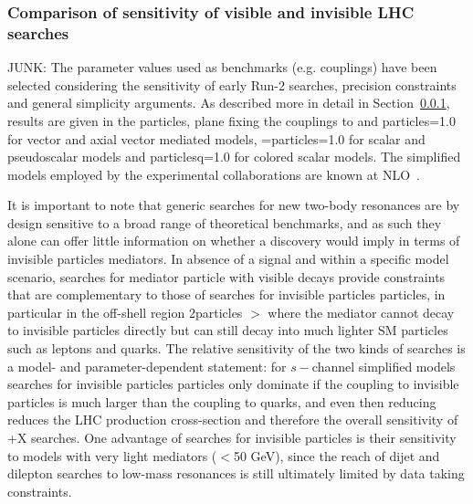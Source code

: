 
\subsubsection{Comparison of sensitivity of visible and invisible LHC searches}
\label{sub:comparisonVisibleInvisible}

JUNK: The parameter values used as benchmarks (e.g. couplings) have been selected considering the sensitivity of early Run-2 searches, precision constraints and general simplicity arguments. As described more in detail in Section~\ref{sub:comparisonVisibleInvisible}, results are given in the \mdm particles, \mmed  plane fixing the couplings to  and \gdm particles=1.0 for vector and axial vector mediated models, \gq=\gdm particles=1.0 for scalar and pseudoscalar models and \gdm particlesq=1.0 for colored scalar models. The simplified models employed by the experimental collaborations are known at NLO~\cite{Neubert:2015fka,Haisch:2013ata,Backovic:2015soa}. 


It is important to note that generic searches for new two-body resonances
are by design sensitive to a broad range of theoretical benchmarks, 
and as such they alone can offer little information on 
whether a discovery would imply in terms of invisible particles mediators.
In absence of a signal and within a specific model scenario,
searches for mediator particle with visible decays
provide constraints that are complementary to those of searches
for invisible particles particles, in particular in the off-shell region 2\minvisible particles $>$ \mmed where the mediator
cannot decay to invisible particles directly but can still decay into much lighter SM particles
such as leptons and quarks. 
The relative sensitivity of the two kinds of searches
is a model- and parameter-dependent statement: for $s-$channel simplified models
searches for invisible particles particles only dominate if the coupling to invisible particles is much larger
than the coupling to quarks, and even then reducing \gq reduces the LHC production
cross-section and therefore the overall sensitivity of \MET+X searches. 
One advantage of searches for invisible particles is their sensitivity to models with
very light mediators ($<$50 GeV), since the reach of dijet and dilepton searches to low-mass
resonances is still ultimately limited by data taking constraints. 

